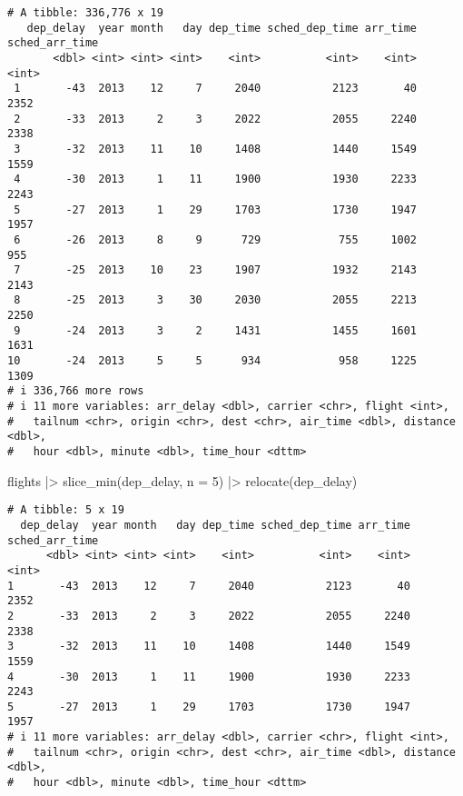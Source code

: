 \documentclass[
  letterpaper,
  DIV=11,
  numbers=noendperiod]{scrreprt}
\newenvironment{Shaded}{\begin{snugshade}}{\end{snugshade}}
\newcommand{\AttributeTok}[1]{\textcolor[rgb]{0.40,0.45,0.13}{#1}}
\newcommand{\DecValTok}[1]{\textcolor[rgb]{0.68,0.00,0.00}{#1}}
\newcommand{\FunctionTok}[1]{\textcolor[rgb]{0.28,0.35,0.67}{#1}}
\newcommand{\NormalTok}[1]{\textcolor[rgb]{0.00,0.23,0.31}{#1}}
\newcommand{\SpecialCharTok}[1]{\textcolor[rgb]{0.37,0.37,0.37}{#1}}
\begin{document}
\begin{enumerate}
\begin{tcolorbox}
\begin{verbatim}
# A tibble: 336,776 x 19
   dep_delay  year month   day dep_time sched_dep_time arr_time sched_arr_time
       <dbl> <int> <int> <int>    <int>          <int>    <int>          <int>
 1       -43  2013    12     7     2040           2123       40           2352
 2       -33  2013     2     3     2022           2055     2240           2338
 3       -32  2013    11    10     1408           1440     1549           1559
 4       -30  2013     1    11     1900           1930     2233           2243
 5       -27  2013     1    29     1703           1730     1947           1957
 6       -26  2013     8     9      729            755     1002            955
 7       -25  2013    10    23     1907           1932     2143           2143
 8       -25  2013     3    30     2030           2055     2213           2250
 9       -24  2013     3     2     1431           1455     1601           1631
10       -24  2013     5     5      934            958     1225           1309
# i 336,766 more rows
# i 11 more variables: arr_delay <dbl>, carrier <chr>, flight <int>,
#   tailnum <chr>, origin <chr>, dest <chr>, air_time <dbl>, distance <dbl>,
#   hour <dbl>, minute <dbl>, time_hour <dttm>
\end{verbatim}

\begin{Shaded}
\begin{Highlighting}[]
\NormalTok{flights }\SpecialCharTok{|\textgreater{}} 
  \FunctionTok{slice\_min}\NormalTok{(dep\_delay, }\AttributeTok{n =} \DecValTok{5}\NormalTok{) }\SpecialCharTok{|\textgreater{}}
  \FunctionTok{relocate}\NormalTok{(dep\_delay)}
\end{Highlighting}
\end{Shaded}

\begin{verbatim}
# A tibble: 5 x 19
  dep_delay  year month   day dep_time sched_dep_time arr_time sched_arr_time
      <dbl> <int> <int> <int>    <int>          <int>    <int>          <int>
1       -43  2013    12     7     2040           2123       40           2352
2       -33  2013     2     3     2022           2055     2240           2338
3       -32  2013    11    10     1408           1440     1549           1559
4       -30  2013     1    11     1900           1930     2233           2243
5       -27  2013     1    29     1703           1730     1947           1957
# i 11 more variables: arr_delay <dbl>, carrier <chr>, flight <int>,
#   tailnum <chr>, origin <chr>, dest <chr>, air_time <dbl>, distance <dbl>,
#   hour <dbl>, minute <dbl>, time_hour <dttm>
\end{verbatim}


\end{tcolorbox}
\end{enumerate}
\end{document}
